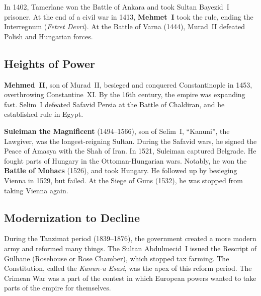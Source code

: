 In 1402, Tamerlane won the Battle of Ankara and took Sultan Bayezid~I prisoner.
At the end of a civil war in 1413, \textbf{Mehmet~I} took the rule,
ending the Interregnum (\textit{Fetret Devri}).
At the Battle of Varna (1444), Murad~II defeated Polish and Hungarian forces.

\subsection*{Heights of Power}

\textbf{Mehmed~II}, son of Murad~II, besieged and conquered Constantinople in 1453,
overthrowing Constantine~XI\@.
By the 16th century, the empire was expanding fast.
Selim~I defeated Safavid Persia at the Battle of Chaldiran, and he established rule in Egypt.

\textbf{Suleiman the Magnificent} (1494--1566), son of Selim~I, ``Kanuni'', the Lawgiver,
was the longest-reigning Sultan.
During the Safavid wars, he signed the Peace of Amasya with the Shah of Iran.
In 1521, Suleiman captured Belgrade.
He fought parts of Hungary in the Ottoman-Hungarian wars.
Notably, he won the \textbf{Battle of Mohacs} (1526), and took Hungary.
He followed up by besieging Vienna in 1529, but failed.
At the Siege of Guns (1532), he was stopped from taking Vienna again.

\subsection*{Modernization to Decline}

During the Tanzimat period (1839--1876),
the government created a more modern army and reformed many things.
The Sultan Abdulmecid~I issued the Rescript of G\"ulhane (Rosehouse or Rose Chamber),
which stopped tax farming.
The Constitution, called the \textit{Kanun-u Esasi}, was the apex of this reform period.
The Crimean War was a part of the contest
in which European powers wanted to take parts of the empire for themselves.
